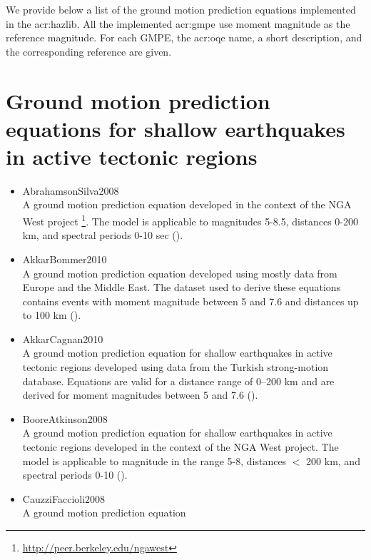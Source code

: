\label{sec:gmpes_list}
We provide below a list of the ground motion prediction equations 
implemented in the \gls{acr:hazlib}. All the implemented \gls{acr:gmpe}
use moment magnitude as the reference magnitude. For each GMPE,
the \gls{acr:oqe} name, a short description, and the corresponding reference
are given.
%
\section[GMPEs for shallow earthquakes in active tectonic regions]{Ground motion prediction equations for shallow earthquakes in active tectonic regions}
\begin{itemize} 
    \item AbrahamsonSilva2008 \hfill \\ A ground motion prediction equation 
        developed in the context of the NGA West project 
		\footnote{\href{http://peer.berkeley.edu/ngawest/}{http://peer.berkeley.edu/ngawest}}.
        The model is applicable to magnitudes 5-8.5, distances 0-200 km, and
        spectral periods 0-10 sec (\cite{abrahamson2008}).
    \item AkkarBommer2010 \hfill \\ A ground motion prediction equation 
        developed using mostly data from Europe and the Middle East. The 
		dataset 
        used to derive these equations contains events with moment 
        magnitude between 5 and 7.6 and distances up to 100 km 
		(\cite{akkar2010}).
    \item AkkarCagnan2010 \hfill \\ A ground motion prediction equation for 
		shallow
        earthquakes in active tectonic regions developed using data from the 
        Turkish strong-motion database. Equations are valid for a distance 
        range of 0–200 km and are derived for moment magnitudes 
        between 5 and 7.6 (\cite{akkar2010a}).
    \item BooreAtkinson2008 \hfill \\ A ground motion prediction equation 
        for shallow earthquakes in active tectonic regions developed in 
        the context of the NGA West project.
        The model is applicable to magnitude in the range 5-8, 
		distances $<$ 200 km,
        and spectral periods 0-10 (\cite{boore2008}).
    \item CauzziFaccioli2008 \hfill \\ A ground motion prediction equation 

\end{itemize}

